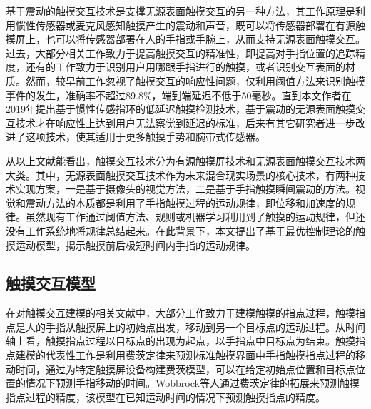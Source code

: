 基于震动的触摸交互技术是支撑无源表面触摸交互的另一种方法，其工作原理是利用惯性传感器或麦克风感知触摸产生的震动和声音，既可以将传感器部署在有源触摸屏上\cite{heo2011forcetap, iwasaki2009expressive, kane2009bonfire, paradiso2002passive, xiao2014toffee}，也可以将传感器部署在人的手指\cite{gu2019accurate, shi2020ready, gu2020qwertyring}或手腕\cite{meier2021tapld}上，从而支持无源表面触摸交互。过去，大部分相关工作致力于提高触摸交互的精准性，即提高对手指位置的追踪精度\cite{lam2002mids, oh2017anywheretouch}，还有的工作致力于识别用户用哪跟手指进行的触摸\cite{masson2017whichfingers}，或者识别交互表面的材质\cite{stearns2018touchcam}。然而，较早前工作忽视了触摸交互的响应性问题，仅利用阈值方法来识别触摸事件的发生\cite{lam2002mids, oh2017anywheretouch, niikura2014anywhere}，准确率不超过89.8\%，端到端延迟不低于50毫秒。直到本文作者在2019年提出基于惯性传感指环的低延迟触摸检测技术\cite{gu2019accurate}，基于震动的无源表面触摸交互技术才在响应性上达到用户无法察觉到延迟的标准，后来有其它研究者进一步改进了这项技术，使其适用于更多触摸手势\cite{shi2020ready}和腕带式传感器\cite{meier2021tapld}。

从以上文献能看出，触摸交互技术分为有源触摸屏技术和无源表面触摸交互技术两大类。其中，无源表面触摸交互技术作为未来混合现实场景的核心技术，有两种技术实现方案，一是基于摄像头的视觉方法，二是基于手指触摸瞬间震动的方法。视觉和震动方法的本质都是利用了手指触摸过程的运动规律，即位移和加速度的规律。虽然现有工作通过阈值方法、规则或机器学习利用到了触摸的运动规律，但还没有工作系统地将规律总结起来。在此背景下，本文提出了基于最优控制理论的触摸运动模型，揭示触摸前后极短时间内手指的运动规律。

\subsection{触摸交互模型}

在对触摸交互建模的相关文献中，大部分工作致力于建模触摸的指点过程，触摸指点是人的手指从触摸屏上的初始点出发，移动到另一个目标点的运动过程。从时间轴上看，触摸指点过程以目标点的出现为起点，以手指点中目标点为结束。触摸指点建模的代表性工作是利用费茨定律\cite{fitts1954information}来预测标准触摸界面中手指触摸指点过程的移动时间\cite{mackenzie1995movement}，通过为特定触摸屏设备构建费茨模型，可以在给定初始点位置和目标点位置的情况下预测手指移动的时间。Wobbrock等人通过费茨定律的拓展来预测触摸指点过程的精度\cite{wobbrock2008error}，该模型在已知运动时间的情况下预测触摸指点的精度。

